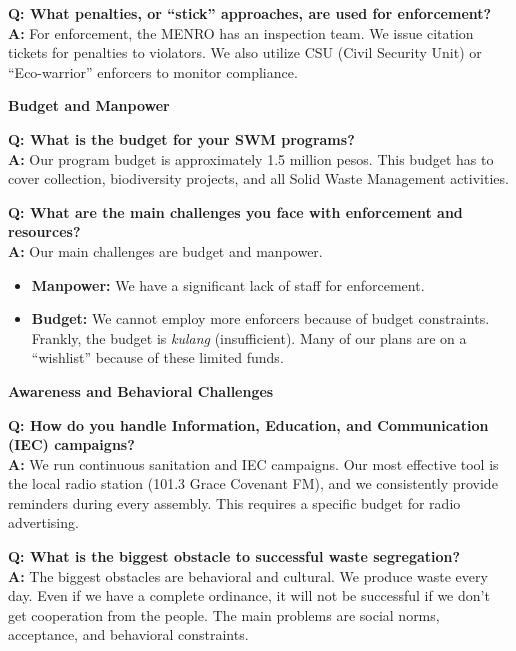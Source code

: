 \noindent \textbf{Q: What penalties, or ``stick'' approaches, are used for enforcement?} \\
\textbf{A:} For enforcement, the MENRO has an inspection team. We issue citation tickets for penalties to violators. We also utilize CSU (Civil Security Unit) or ``Eco-warrior'' enforcers to monitor compliance.

\vspace{0.5cm}

\noindent \textbf{\large Budget and Manpower}
\vspace{0.2cm}

\noindent \textbf{Q: What is the budget for your SWM programs?} \\
\textbf{A:} Our program budget is approximately 1.5 million pesos. This budget has to cover collection, biodiversity projects, and all Solid Waste Management activities.

\vspace{0.3cm}

\noindent \textbf{Q: What are the main challenges you face with enforcement and resources?} \\
\textbf{A:} Our main challenges are budget and manpower.
\begin{itemize}
    \item \textbf{Manpower:} We have a significant lack of staff for enforcement.
    \item \textbf{Budget:} We cannot employ more enforcers because of budget constraints. Frankly, the budget is \textit{kulang} (insufficient). Many of our plans are on a ``wishlist'' because of these limited funds.
\end{itemize}

\vspace{0.5cm}

\noindent \textbf{\large Awareness and Behavioral Challenges}
\vspace{0.2cm}

\noindent \textbf{Q: How do you handle Information, Education, and Communication (IEC) campaigns?} \\
\textbf{A:} We run continuous sanitation and IEC campaigns. Our most effective tool is the local radio station (101.3 Grace Covenant FM), and we consistently provide reminders during every assembly. This requires a specific budget for radio advertising.

\vspace{0.3cm}

\noindent \textbf{Q: What is the biggest obstacle to successful waste segregation?} \\
\textbf{A:} The biggest obstacles are behavioral and cultural. We produce waste every day. Even if we have a complete ordinance, it will not be successful if we don't get cooperation from the people. The main problems are social norms, acceptance, and behavioral constraints.

